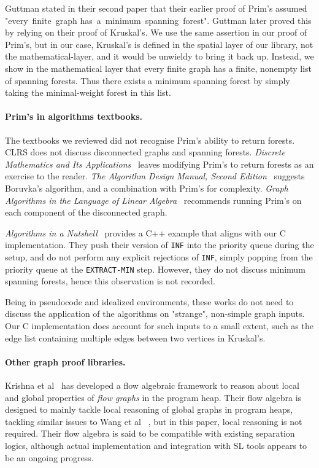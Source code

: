 Guttman stated in their second paper that their earlier proof of Prim's assumed "every~finite~graph has~a~minimum~spanning~forest". Guttman later proved this by relying on their proof of Kruskal's. We use the same assertion in our proof of Prim's, but in our case, Kruskal's is defined in the spatial layer of our library, not the mathematical-layer, and it would be unwieldy to bring it back up. Instead, we show in the mathematical layer that every finite graph has a finite, nonempty list of spanning forests. Thus there exists a minimum spanning forest by simply taking the minimal-weight forest in this list.

\paragraph{Prim's in algorithms textbooks.} The textbooks we reviewed did not recognise Prim's ability to return forests. CLRS does not discuss disconnected graphs and spanning forests. \textit{Discrete Mathematics and Its Applications}~\cite{rozen} leaves modifying Prim's to return forests as an exercise to the reader. \textit{The Algorithm Design Manual, Second Edition}~\cite{DBLP:books/daglib/0022194} suggests Boruvka’s algorithm, and a combination with Prim's for complexity. \textit{Graph Algorithms in the Language of Linear Algebra}~\cite{kepnergilbert} recommends running Prim's on each component of the disconnected graph.

\textit{Algorithms in a Nutshell}~\cite{heineman2008algorithms} provides a C++ example that aligns with our C implementation. They push their version of \texttt{INF} into the priority queue during the setup, and do not perform any explicit rejections of \texttt{INF}, simply popping from the priority queue at the \texttt{EXTRACT-MIN} step. However, they do not discuss minimum spanning forests, hence this observation is not recorded.

Being in pseudocode and idealized environments, these works do not need to discuss the application of the algorithms on "strange", non-simple graph inputs. Our C implementation does account for such inputs to a small extent, such as the edge list containing multiple edges between two vertices in Kruskal's.

\paragraph{Other graph proof libraries.} Krishna et al~\cite{DBLP:conf/esop/KrishnaSW20} has developed a flow algebraic framework to reason about local and global properties of \textit{flow graphs} in the program heap. Their flow algebra is designed to mainly tackle local reasoning of global graphs in program heaps, tackling similar issues to Wang et al ~\cite{DBLP:journals/pacmpl/WangCMH19}, but in this paper, local reasoning is not required. Their flow algebra is said to be compatible with existing separation logics, although actual implementation and integration with SL tools appears to be an ongoing progress.

